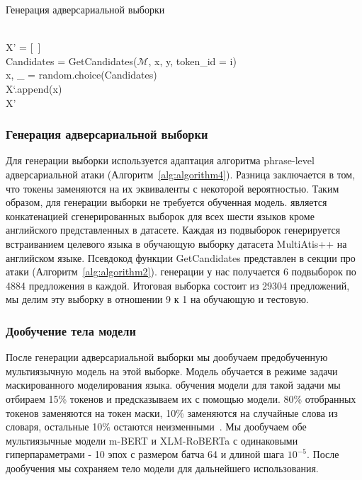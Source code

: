 \begin{algorithm}
    \caption{Генерация адверсариальной выборки}
    \begin{algorithmic}
         \\
        X' = [~]
                    \\
                    \ind\ind\ind Candidates = GetCandidates($\mathcal{M}$, x, y, token\_id = i)
                    \ind{}
                            \\
                            \ind\ind\ind\ind x, \_ = random.choice(Candidates)
                    \EndIf
                \EndFor \\
                \ind\ind X`.append(x)
            \EndFor
        \EndFor \\
        \Return X'
    \end{algorithmic}\label{alg:algorithm4}
\end{algorithm}

\subsubsection{Генерация адверсариальной выборки}
Для генерации выборки используется адаптация алгоритма phrase-level адверсариальной атаки (Алгоритм~\eqref{alg:algorithm4}).
Разница заключается в том, что токены заменяются на их эквиваленты с некоторой вероятностью.
Таким образом, для генерации выборки не требуется обученная модель.
 является конкатенацией сгенерированных выборок для всех шести языков кроме английского представленных в датасете.
Каждая из подвыборок генерируется встраиванием целевого языка в обучающую выборку датасета MultiAtis++ на английском языке.
Псевдокод функции GetCandidates представлен в секции про атаки (Алгоритм~\eqref{alg:algorithm2}).
 генерации у нас получается 6 подвыборок по 4884 предложения в каждой.
Итоговая выборка состоит из 29304 предложений, мы делим эту выборку в отношении 9 к 1 на обучающую и тестовую.

\subsubsection{Дообучение тела модели}
После генерации адверсариальной выборки мы дообучаем предобученную мультиязычную модель на этой выборке.
Модель обучается в режиме задачи маскированного моделирования языка.
 обучения модели для такой задачи мы отбираем 15\% токенов и предсказываем их с помощью модели.
80\% отобранных токенов заменяются на токен маски, 10\% заменяются на случайные слова из словаря, остальные 10\% остаются неизменными~\cite{devlin-etal-2019-bert}.
Мы дообучаем обе мультиязычные модели m-BERT и XLM-RoBERTa с одинаковыми гиперпараметрами - 10 эпох с размером батча 64 и длиной шага $10^{-5}$.
После дообучения мы сохраняем тело модели для дальнейшего использования.

